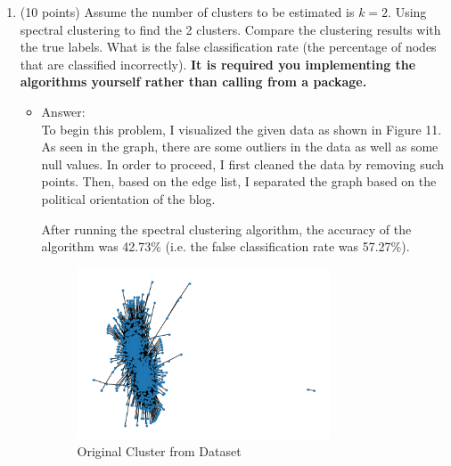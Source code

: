 \documentclass[twoside,10pt]{article}
\begin{document}
\begin{enumerate}
\begin{enumerate}
\item (10 points)  Assume the number of clusters to be estimated is $k = 2$. Using spectral clustering to find the 2 clusters. Compare the clustering results with the true labels. What is the false classification rate (the percentage of nodes that are classified incorrectly). {\bf It is required you implementing the algorithms yourself rather than calling from a package.}
\begin{itemize}
\item Answer:\\
To begin this problem, I visualized the given data as shown in Figure 11. As seen in the graph, there are some outliers in the data as well as some null values. In order to proceed, I first cleaned the data by removing such points. Then, based on the edge list, I separated the graph based on the political orientation of the blog.

After running the spectral clustering algorithm, the accuracy of the algorithm was 42.73\% (i.e. the false classification rate was 57.27\%).
\begin{figure}
\centering
\includegraphics[height=2in]{Images/InitialCluster.png}
\caption{Original Cluster from Dataset}
\end{figure}
\end{itemize}


\end{enumerate}
\end{enumerate}
\end{document}

